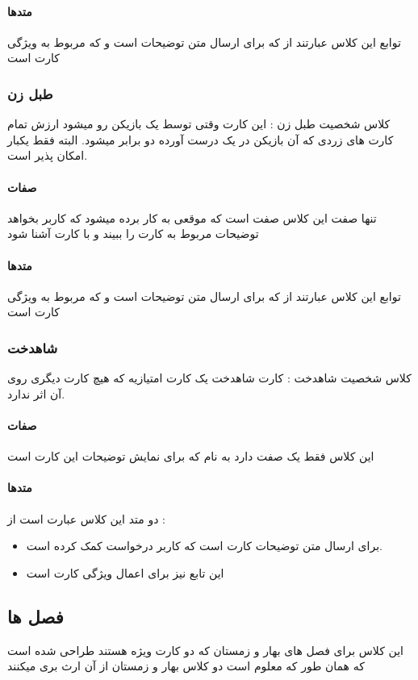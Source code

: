 \documentclass[pdf,titlepage,a4paper]{report}
\begin{document}
	 \paragraph{متدها}
	 توابع این کلاس عبارتند از  
	  که برای ارسال متن توضیحات است 
	 و  که مربوط به ویژگی کارت است
	\subsubsection{طبل زن}
	 کلاس شخصیت طبل زن : این کارت وقتی توسط یک بازیکن رو میشود ارزش تمام کارت های زردی که آن بازیکن در یک درست آورده دو برابر میشود. البته فقط یکبار امکان پذیر است.

    \paragraph{صفات}
	تنها  صفت این کلاس صفت   است که موقعی به کار برده میشود که کاربر بخواهد توضیحات مربوط به کارت را ببیند و با کارت آشنا شود
	\paragraph{متدها}
	توابع این کلاس عبارتند از  
	 که برای ارسال متن توضیحات است 
	و  که مربوط به ویژگی کارت است
	\subsubsection{شاهدخت}
	 کلاس شخصیت شاهدخت : کارت شاهدخت یک کارت امتیازیه که هیچ کارت دیگری روی آن اثر ندارد.
	\paragraph{صفات}
	این کلاس فقط یک صفت دارد به نام   که برای نمایش توضیحات این کارت است
	\paragraph{متدها}

	 دو متد این کلاس عبارت است از : \\
	
	\begin{itemize}
		\item {}  برای ارسال متن توضیحات کارت است که کاربر درخواست کمک کرده است.
		\item {} این تابع نیز برای اعمال ویژگی کارت است
	\end{itemize}
	

	\subsection{فصل ها}
    این کلاس برای فصل های بهار و زمستان که دو کارت ویژه هستند طراحی شده است که همان طور که معلوم است دو کلاس بهار و زمستان از آن ارث بری میکنند
\end{document}
